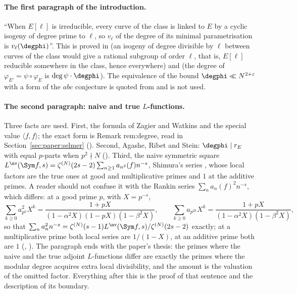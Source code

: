 \begin{sloppypar}
\paragraph{The first paragraph of the introduction.} ``When $E[\ell]$ is irreducible, every curve of the class is linked to $E$ by a cyclic isogeny of
degree prime to $\ell$, so $v_\ell$ of the degree of its minimal parametrisation is $v_\ell(\degphi)$''. This is proved in  (an isogeny of
degree divisible by $\ell$ between curves of the class would give a rational subgroup of order $\ell$, that is, $E[\ell]$ reducible somewhere in the class,
hence everywhere) and  (the degree of $\varphi_{E'}=\psi\circ\varphi_E$ is $\deg\psi\cdot\degphi$). The equivalence of the bound $\degphi\ll N^{2+\varepsilon}$
with a form of the $abc$ conjecture is quoted from \cite[Section 2]{ARS12} and is not used.

\paragraph{The second paragraph: naive and true $L$-functions.} Three facts are used. First, the formula of Zagier and Watkins and the special value
$\langle f,f\rangle$; the exact form is Remark rem:degree, read in Section~\ref{sec:paper:selmer} (). Second, Agashe, Ribet and Stein:
$\degphi\mid r_E$ with equal $p$-parts when $p^2\nmid N$ (). Third, the naive symmetric square
$L^{\nv}(\Sym f,s)=\zeta^{(N)}(2s-2)\sum_{n\ge1}a_{n^2}(f)n^{-s}$, Shimura's series \cite{Shimura75}, whose local factors are the true ones at good and multiplicative
primes and $1$ at the additive primes. A reader should not confuse it with the Rankin series $\sum_na_n(f)^2n^{-s}$, which differs: at a good prime $p$, with $X=p^{-s}$,
\[
\sum_{k\ge0}a_{p^k}^2X^k=\frac{1+pX}{(1-\alpha^2X)(1-pX)(1-\beta^2X)},\qquad\sum_{k\ge0}a_{p^{2k}}X^k=\frac{1+pX}{(1-\alpha^2X)(1-\beta^2X)},
\]
so that $\sum_na_n^2n^{-s}=\zeta^{(N)}(s-1)L^{\nv}(\Sym f,s)/\zeta^{(N)}(2s-2)$ exactly; at a multiplicative prime both local series are $1/(1-X)$, at an additive
prime both are $1$ (, ). The paragraph ends with the paper's thesis: the primes where the naive and the true adjoint
$L$-functions differ are exactly the primes where the modular degree acquires extra local divisibility, and the amount is the valuation of the omitted factor.
Everything after this is the proof of that sentence and the description of its boundary.


\end{sloppypar}
